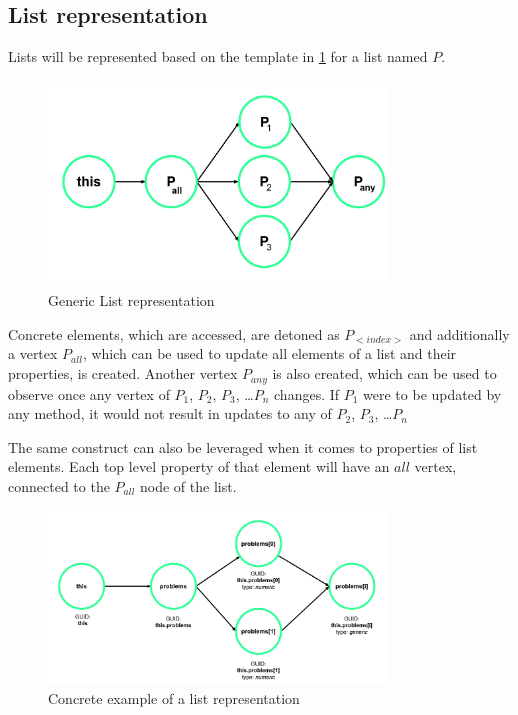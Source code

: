 \subsection{List representation}
\label{concept:list_creation}

Lists will be represented based on the template in \ref{fig:graph_list_generic} for a list named $P$.  %
\begin{figure}[H]
    \includegraphics[width=0.8\textwidth]{images/graph_list_generic.png}
     \caption{Generic List representation}
     \label{fig:graph_list_generic}
\end{figure}

Concrete elements, which are accessed, are detoned as $P_{<index>}$ and additionally a vertex $P_{all}$, which can be used to update all elements of a list\label{concept:why_create_list} and their properties, is created. Another vertex $P_{any}$ is also created, which can be used to observe once any vertex of $P_1$, $P_2$, $P_3$, \dots $P_n$ changes. If $P_1$ were to be updated by any method, it would not result in updates to any of $P_2$, $P_3$, \dots $P_n$

The same construct can also be leveraged when it comes to properties of list elements. Each top level property of that element will have an $all$ vertex, connected to the $P_{all}$ node of the list.  

\begin{figure}[H]
    \includegraphics[width=0.8\textwidth]{images/graph_list.png}
     \caption{Concrete example of a list representation}
     \label{fig:graph_list}
\end{figure}

